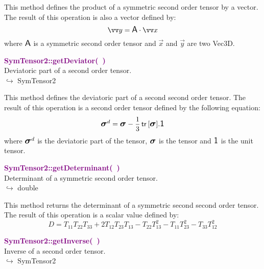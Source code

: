 This method defines the product of a symmetric second order tensor by a vector.
The result of this operation is also a vector defined by:
\begin{equation*}
\overrightarrow{y} = \A \cdot \overrightarrow{x}
\end{equation*}
where $\mbox{\large\ensuremath{\mathsf{A}}}$ is a symmetric second order tensor and $\overrightarrow{x}$ and $\overrightarrow{y}$ are two Vec3D.

\textcolor{purple}{\textbf{SymTensor2::getDeviator(~)}}\label{SymTensor2::getDeviator()}\\
Deviatoric part of a second order tensor.\\ \hspace*{10mm}$\hookrightarrow$ SymTensor2

This method defines the deviatoric part of a second second order tensor.
The result of this operation is a second order tensor defined by the following equation:
\begin{equation*}
\mbox{\large\ensuremath{\boldsymbol{\sigma}}}^d=\mbox{\large\ensuremath{\boldsymbol{\sigma}}}-\frac{1}{3}\mbox{\ensuremath{\mathsf{\,tr\,}}}[\mbox{\large\ensuremath{\boldsymbol{\sigma}}}].\mbox{\large\ensuremath{\mathsf{1}}}
\end{equation*}
where $\mbox{\large\ensuremath{\boldsymbol{\sigma}}}^d$ is the deviatoric part of the tensor, $\mbox{\large\ensuremath{\boldsymbol{\sigma}}}$ is the tensor and $\mbox{\large\ensuremath{\mathsf{1}}}$ is the unit tensor.

\textcolor{purple}{\textbf{SymTensor2::getDeterminant(~)}}\label{SymTensor2::getDeterminant()}\\
Determinant of a symmetric second order tensor.\\ \hspace*{10mm}$\hookrightarrow$ double

This method returns the determinant of a symmetric second second order tensor.
The result of this operation is a scalar value defined by:
\begin{equation*}
D = T_{11} T_{22} T_{33} + 2 T_{12} T_{23} T_{13} - T_{22} T_{13}^2 - T_{11} T_{23}^2 - T_{33} T_{12}^2
\end{equation*}

\textcolor{purple}{\textbf{SymTensor2::getInverse(~)}}\label{SymTensor2::getInverse()}\\
Inverse of a second order tensor.\\ \hspace*{10mm}$\hookrightarrow$ SymTensor2

